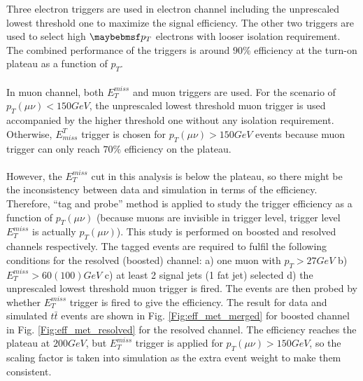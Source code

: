 \noindent
Three electron triggers are used in electron channel including the unprescaled lowest threshold one to maximize the signal efficiency. The other two triggers are used to select high $\p_{T}$ electrons with looser isolation requirement. The combined performance of the triggers is around $90\%$ efficiency at the turn-on plateau as a function of $p_{T}$.
\\
\\In muon channel, both $E_{T}^{miss}$ and muon triggers are used. For the scenario of $p_{T}(\mu\nu)<150GeV$, the unprescaled lowest threshold muon trigger is used accompanied by the higher threshold one without any isolation requirement. Otherwise, $E^{T}_{miss}$ trigger is chosen for $p_{T}(\mu\nu)>150GeV$ events because muon trigger can only reach $70\%$ efficiency on the plateau.
\\
\\However, the $E^{miss}_{T}$ cut in this analysis is below the plateau, so there might be the inconsistency between data and simulation in terms of the efficiency. Therefore, ``tag and probe'' method is applied to study the trigger efficiency as a function of $p_{T}(\mu\nu)$ (because muons are invisible in trigger level, trigger level $E_{T}^{miss}$ is actually $p_{T}(\mu\nu)$). This study is performed on boosted and resolved channels respectively. The tagged events are required to fulfil the following conditions for the resolved (boosted) channel: a) one muon with $p_{T}>27GeV$ b) $E^{miss}_{T}>60(100)GeV$ c) at least 2 signal jets (1 fat jet) selected d) the unprescaled lowest threshold muon trigger is fired. The events are then probed by whether $E^{miss}_{T}$ trigger is fired to give the efficiency. The result for data and simulated $t\bar{t}$ events are shown in Fig. \ref{Fig:eff_met_merged} for boosted channel in Fig. \ref{Fig:eff_met_resolved} for the resolved channel. The efficiency reaches the plateau at $200GeV$, but $E^{miss}_{T}$ trigger is applied for $p_{T}(\mu\nu)>150GeV$, so the scaling factor is taken into simulation as the extra event weight to make them consistent. 
